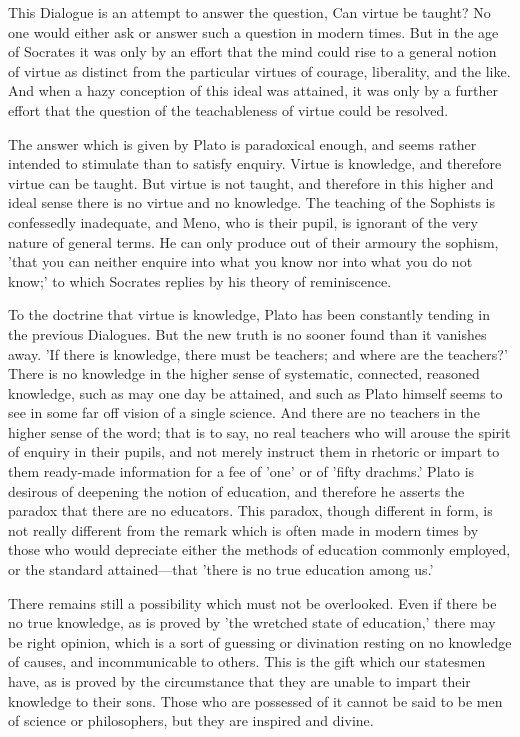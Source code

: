 \documentclass[11pt,letter]{article}
\begin{document}
\par  This Dialogue is an attempt to answer the question, Can virtue be taught? No one would either ask or answer such a question in modern times. But in the age of Socrates it was only by an effort that the mind could rise to a general notion of virtue as distinct from the particular virtues of courage, liberality, and the like. And when a hazy conception of this ideal was attained, it was only by a further effort that the question of the teachableness of virtue could be resolved.

\par  The answer which is given by Plato is paradoxical enough, and seems rather intended to stimulate than to satisfy enquiry. Virtue is knowledge, and therefore virtue can be taught. But virtue is not taught, and therefore in this higher and ideal sense there is no virtue and no knowledge. The teaching of the Sophists is confessedly inadequate, and Meno, who is their pupil, is ignorant of the very nature of general terms. He can only produce out of their armoury the sophism, 'that you can neither enquire into what you know nor into what you do not know;' to which Socrates replies by his theory of reminiscence.

\par  To the doctrine that virtue is knowledge, Plato has been constantly tending in the previous Dialogues. But the new truth is no sooner found than it vanishes away. 'If there is knowledge, there must be teachers; and where are the teachers?' There is no knowledge in the higher sense of systematic, connected, reasoned knowledge, such as may one day be attained, and such as Plato himself seems to see in some far off vision of a single science. And there are no teachers in the higher sense of the word; that is to say, no real teachers who will arouse the spirit of enquiry in their pupils, and not merely instruct them in rhetoric or impart to them ready-made information for a fee of 'one' or of 'fifty drachms.' Plato is desirous of deepening the notion of education, and therefore he asserts the paradox that there are no educators. This paradox, though different in form, is not really different from the remark which is often made in modern times by those who would depreciate either the methods of education commonly employed, or the standard attained—that 'there is no true education among us.'

\par  There remains still a possibility which must not be overlooked. Even if there be no true knowledge, as is proved by 'the wretched state of education,' there may be right opinion, which is a sort of guessing or divination resting on no knowledge of causes, and incommunicable to others. This is the gift which our statesmen have, as is proved by the circumstance that they are unable to impart their knowledge to their sons. Those who are possessed of it cannot be said to be men of science or philosophers, but they are inspired and divine.
\end{document}

